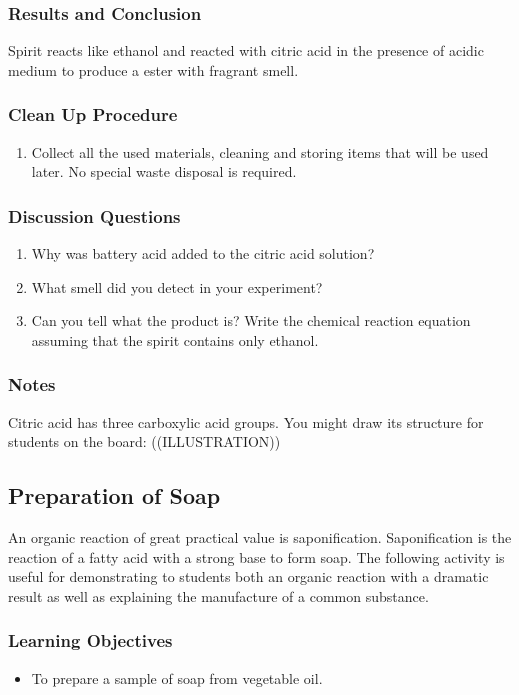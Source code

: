 \subsubsection*{Results and Conclusion}
Spirit reacts like ethanol and reacted with citric acid in the presence of acidic medium to produce a ester with fragrant smell.

\subsubsection*{Clean Up Procedure}
\begin{enumerate}
\item{Collect all the used materials, cleaning and storing items that will be used later. No special waste disposal is required.}
\end{enumerate}

\subsubsection*{Discussion Questions}
\begin{enumerate}
\item{Why was battery acid added to the citric acid solution?}
\item{What smell did you detect in your experiment?}
\item{Can you tell what the product is? Write the chemical reaction equation assuming that the spirit contains only ethanol.}
\end{enumerate}

\subsubsection*{Notes}
Citric acid has three carboxylic acid groups. You might draw its structure for students on the board: ((ILLUSTRATION))

\subsection{Preparation of Soap}

An organic reaction of great practical value is saponification. Saponification is the reaction of a fatty acid with a strong base to form soap. The following activity is useful for demonstrating to students both an organic reaction with a dramatic result as well as explaining the manufacture of a common substance.

\subsubsection*{Learning Objectives}
\begin{itemize}
\item{To prepare a sample of soap from vegetable oil.}
\end{itemize}

